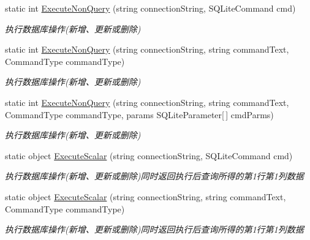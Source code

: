 \begin{DoxyCompactItemize}
\item 
static int \hyperlink{class_x_c_l_net_tools_1_1_data_base_1_1_s_q_lite_1_1_s_q_lite_helper_a20c508df465baf613204fc20b7f42d4c}{Execute\+Non\+Query} (string connection\+String, S\+Q\+Lite\+Command cmd)
\begin{DoxyCompactList}\small\item\em 执行数据库操作(新增、更新或删除) \end{DoxyCompactList}\item 
static int \hyperlink{class_x_c_l_net_tools_1_1_data_base_1_1_s_q_lite_1_1_s_q_lite_helper_a934ecf6111b8ec537b6ea97b54b4d409}{Execute\+Non\+Query} (string connection\+String, string command\+Text, Command\+Type command\+Type)
\begin{DoxyCompactList}\small\item\em 执行数据库操作(新增、更新或删除) \end{DoxyCompactList}\item 
static int \hyperlink{class_x_c_l_net_tools_1_1_data_base_1_1_s_q_lite_1_1_s_q_lite_helper_abb12a188027b7197116cea2dc2cf3086}{Execute\+Non\+Query} (string connection\+String, string command\+Text, Command\+Type command\+Type, params S\+Q\+Lite\+Parameter\mbox{[}$\,$\mbox{]} cmd\+Parms)
\begin{DoxyCompactList}\small\item\em 执行数据库操作(新增、更新或删除) \end{DoxyCompactList}\item 
static object \hyperlink{class_x_c_l_net_tools_1_1_data_base_1_1_s_q_lite_1_1_s_q_lite_helper_a5294ae0c127272d14b81ce861fbc418c}{Execute\+Scalar} (string connection\+String, S\+Q\+Lite\+Command cmd)
\begin{DoxyCompactList}\small\item\em 执行数据库操作(新增、更新或删除)同时返回执行后查询所得的第1行第1列数据 \end{DoxyCompactList}\item 
static object \hyperlink{class_x_c_l_net_tools_1_1_data_base_1_1_s_q_lite_1_1_s_q_lite_helper_a65ee6d56d5b8b92809288bcecd9e63fc}{Execute\+Scalar} (string connection\+String, string command\+Text, Command\+Type command\+Type)
\begin{DoxyCompactList}\small\item\em 执行数据库操作(新增、更新或删除)同时返回执行后查询所得的第1行第1列数据 \end{DoxyCompactList}\item 

\end{DoxyCompactItemize}
